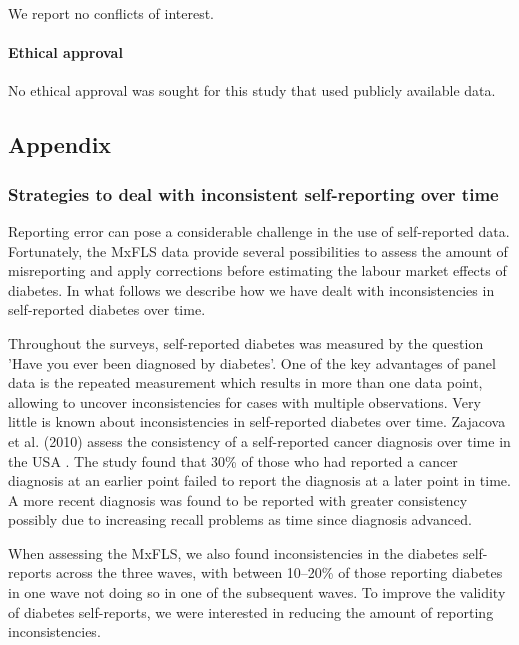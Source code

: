 \documentclass[10pt,letterpaper]{article}
\begin{document}
We report no conflicts of interest.

\subsection*{Ethical approval}

No ethical approval was sought for this study that used publicly available data.


\clearpage
\begin{appendix}
	
	
	
	\part*{\label{part:Appendix}Appendix}
	
	\section*{\label{sec:Appendix}Strategies to deal with inconsistent self-reporting over time}
	
	Reporting error can pose a considerable challenge in the use of self-reported data. Fortunately, the \ac{MxFLS} data provide several possibilities to assess the amount of misreporting and apply corrections before estimating the labour market effects of diabetes. In what follows we describe how we have dealt with inconsistencies in self-reported diabetes over time.
	
	Throughout the surveys, self-reported diabetes was measured by the question 'Have you ever been diagnosed by diabetes'. One of the key advantages of panel data is the repeated measurement which results in more than one data point, allowing to uncover inconsistencies for cases with multiple observations. Very little is known about inconsistencies in self-reported diabetes over time. Zajacova et al. (2010) assess the consistency of a self-reported cancer diagnosis over time in the USA \cite{Zajacova2010}. The study found that 30\% of those who had reported a cancer diagnosis at an earlier point failed to report the diagnosis at a later point in time. A more recent diagnosis was found to be reported with greater consistency possibly due to increasing recall problems as time since diagnosis advanced.
	
	When assessing the \ac{MxFLS}, we also found inconsistencies in the diabetes self-reports across the three waves, with between 10--20\% of those reporting diabetes in one wave not doing so in one of the subsequent waves. To improve the validity of diabetes self-reports, we were interested in reducing the amount of reporting inconsistencies.
	

\end{appendix}
\end{document}
